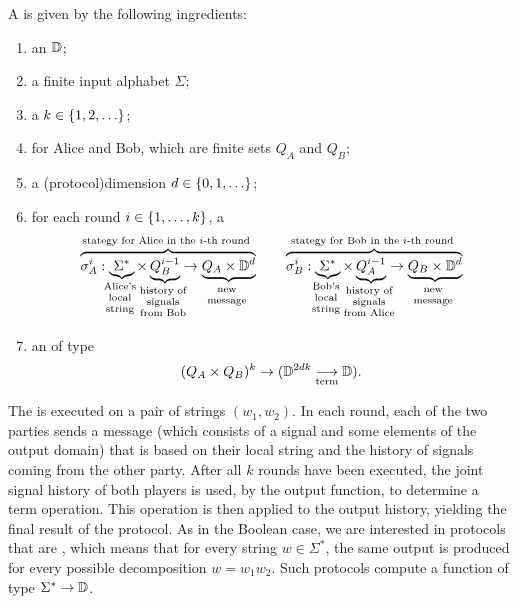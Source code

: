 \begin{definition}\label{def:two-party-protocol-general} A 
   is given by the following ingredients: 
  \begin{enumerate}
    \item an  $\mathbb D$;
    \item a finite input alphabet $\Sigma$;
    \item a  $k \in \{1,2,\ldots\}$;
    \item {} for Alice and Bob, which are finite sets $Q_A$ and $Q_B$;
    \item a \intro(protocol){dimension} $d \in \{0,1,\ldots\}$;
    \item for each round $i \in \{1,\ldots,k\}$, a 
    \begin{align*}
    \myoverbrace{\sigma_A^i : \myunderbrace{\Sigma^*}{Alice's \\ local\\ string} \times \myunderbrace{Q_B^{i-1}}{history of \\ signals \\ from Bob}  \to \myunderbrace{Q_A \times \domain^d}{new\\ message}}{stategy for Alice in the $i$-th round}
    \qquad 
        \myoverbrace{\sigma_B^i : \myunderbrace{\Sigma^*}{Bob's \\ local\\ string} \times \myunderbrace{Q_A^{i-1}}{history of \\ signals \\ from Alice}  \to \myunderbrace{Q_B \times \domain^d}{new\\ message}}{stategy for Bob in the $i$-th round}
    \end{align*}
    \item an  of type \begin{align*}
    (Q_A \times Q_B)^{k} \to (\mathbb D^{2dk} \underset{\text{term}}{\longrightarrow} \mathbb D).
    \end{align*}
  \end{enumerate}
\end{definition}


\AP
The  is executed on a pair of strings $(w_1,w_2)$. In each round, each
of the two parties  sends a message (which consists of a signal and some
elements of the output domain) that is based on their local string and the
history of signals coming from the other party. After all $k$ rounds have been
executed, the joint signal history of both players is used, by the output
function, to determine a term operation. This operation is then applied to the
output history, yielding the final result of the protocol. As in the Boolean
case, we are interested in protocols that are , which means that
for every string $w \in \Sigma^*$, the same output is produced for every
possible decomposition $w = w_1 w_2$. Such protocols compute a function of type
$\Sigma^* \to \mathbb D$. 

